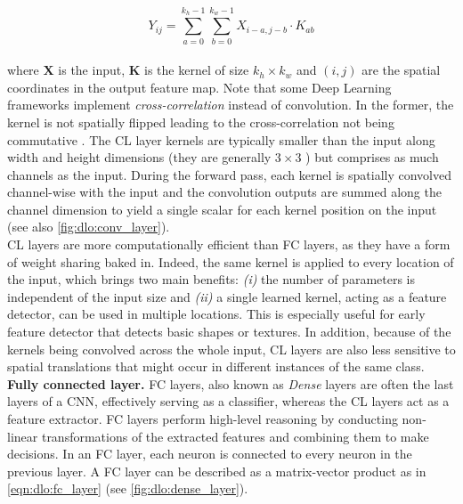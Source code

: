 \begin{equation}
  \label{eqn:dlo:convolution}
    Y_{ij} = \sum_{{a=0}}^{{k_h-1}} \sum_{{b=0}}^{{k_w-1}} X_{i-a, j-b} \cdot K_{ab}    
\end{equation}\\

\noindent where $\mathbf{X}$ is the input, $\mathbf{K}$ is the kernel of size
$k_h \times k_w$ and $(i,j)$ are the spatial coordinates in the output feature
map. Note that some Deep Learning frameworks implement \emph{cross-correlation}
instead of convolution. In the former, the kernel is not spatially flipped
leading to the cross-correlation not being commutative
\cite{goodfellow2016deep}. The \ac{CL} layer kernels are typically smaller than
the input along width and height dimensions (they are generally $3\times 3$
\cite{DBLP:conf/cvpr/HeZRS16}) but comprises as much channels as the input.
During the forward pass, each kernel is spatially convolved channel-wise with
the input and the convolution outputs are summed along the channel dimension to
yield a single scalar for each kernel position on the input (see also
\cref{fig:dlo:conv_layer}).\\

\ac{CL} layers are more computationally efficient than \ac{FC} layers, as they
have a form of weight sharing baked in. Indeed, the same kernel is applied to
every location of the input, which brings two main benefits: \emph{(i)} the
number of parameters is independent of the input size and \emph{(ii)} a single
learned kernel, acting as a feature detector, can be used in multiple locations.
This is especially useful for early feature detector that detects basic shapes
or textures. In addition, because of the kernels being convolved across the
whole input, \ac{CL} layers are also less sensitive to spatial translations that
might occur in different instances of the same class.\\

\noindent \textbf{Fully connected layer.} \ac{FC} layers, also known as
\emph{Dense} layers are often the last layers of a \ac{CNN}, effectively serving
as a classifier, whereas the \ac{CL} layers act as a feature extractor.
\ac{FC} layers perform high-level reasoning by conducting non-linear
transformations of the extracted features and combining them to make decisions.
In an FC layer, each neuron is connected to every neuron in the previous layer.
A \ac{FC} layer can be described as a matrix-vector product as in
\cref{eqn:dlo:fc_layer} (see \cref{fig:dlo:dense_layer}).\\

